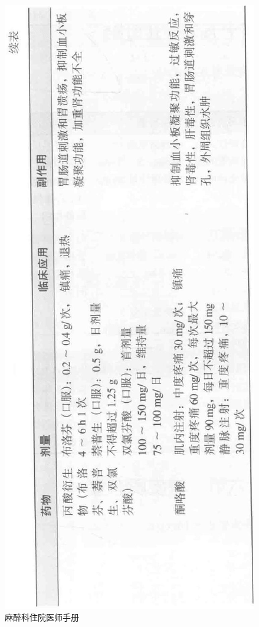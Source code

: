 \documentclass[10pt]{article}
\begin{document}
\includegraphics[max width=\textwidth, center]{2024_07_05_645bb794a4d4f32ee0c8g-355}\\
麻醉科住院医师手册
\end{document}

